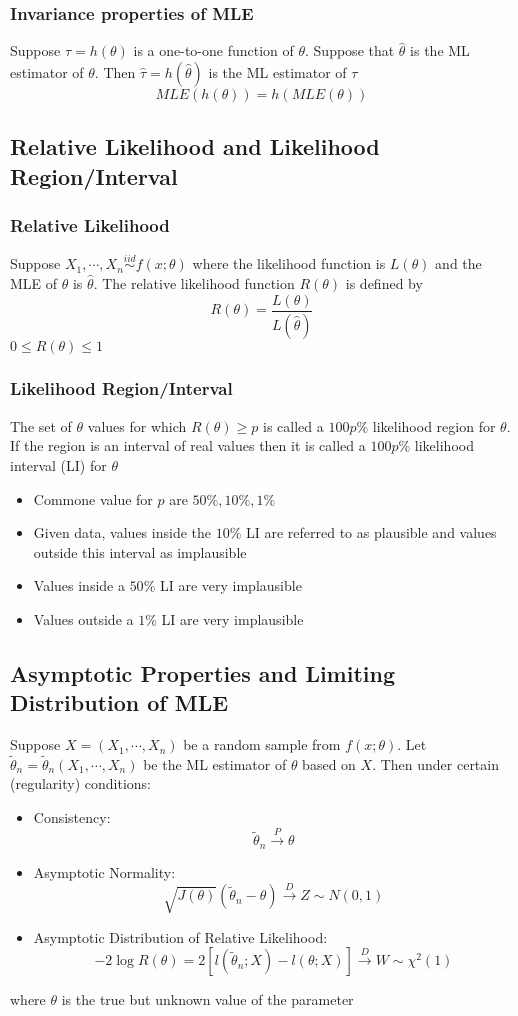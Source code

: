 \documentclass[11pt]{article}
\begin{document}
\subsubsection{Invariance properties of MLE}
Suppose $\tau=h(\theta)$ is a one-to-one function of $\theta$. Suppose that $\hat{\theta}$ is the ML estimator of $\theta$. 
Then $\hat\tau=h(\hat\theta)$ is the ML estimator of $\tau$
\[MLE(h(\theta)) = h(MLE(\theta))\]
\subsection{Relative Likelihood and Likelihood Region/Interval}
\subsubsection{Relative Likelihood}
Suppose $X_1,\cdots,X_n\overset{iid}{\sim}f(x;\theta)$ where the likelihood function is $L(\theta)$ and the MLE of $\theta$ is $\hat\theta$. The 
relative likelihood function $R(\theta)$ is defined by 
\[R(\theta) = \frac{L(\theta)}{L(\hat\theta)}\]
$0\leq R(\theta)\leq 1$
\subsubsection{Likelihood Region/Interval}
The set of $\theta$ values for which $R(\theta)\geq p$ is called a $100p\%$ likelihood region for $\theta$.
If the region is an interval of real values then it is called a $100p\%$ likelihood interval (LI) for $\theta$
\begin{itemize}
    \item Commone value for $p$ are $50\%,10\%,1\%$
    \item Given data, values inside the $10\%$ LI are referred to as plausible and values outside this interval as implausible 
    \item Values inside a $50\%$ LI are very implausible
    \item Values outside a $1\%$ LI are very implausible
\end{itemize}
\subsection{Asymptotic Properties and Limiting Distribution of MLE}
Suppose $X=(X_1,\cdots,X_n)$ be a random sample from $f(x;\theta)$. Let $\tilde{\theta}_n=\tilde{\theta}_n(X_1,\cdots,X_n)$
be the ML estimator of $\theta$ based on $X$. Then under certain (regularity) conditions:
\begin{itemize}
    \item Consistency: \[\tilde{\theta}_n\overset{P}{\rightarrow}\theta\]
    \item Asymptotic Normality: \[\sqrt{J(\theta)}(\tilde{\theta}_n-\theta)\overset{D}{\rightarrow}Z\sim N(0,1)\]
    \item Asymptotic Distribution of Relative Likelihood: \[-2\log R(\theta)=2[l(\tilde{\theta}_n;X)-l(\theta;X)]\overset{D}{\rightarrow}W\sim\chi^2(1)\]
\end{itemize}
where $\theta$ is the true but unknown value of the parameter 
\end{document}

